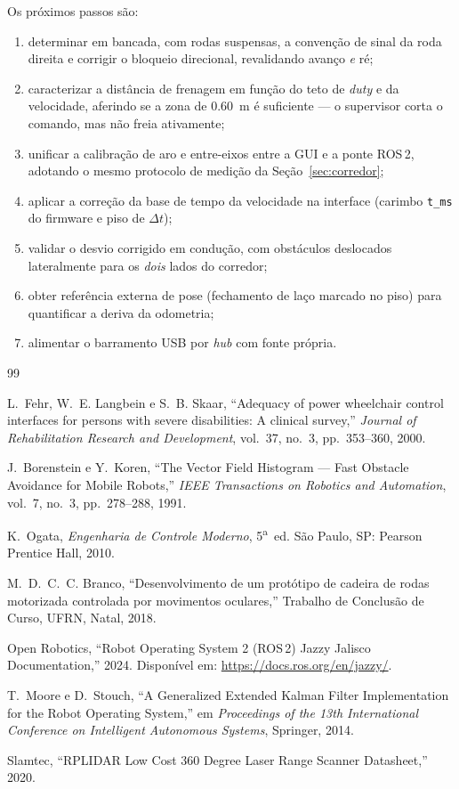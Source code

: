 \documentclass[conference]{IEEEtran}
\begin{document}
Os próximos passos são:
\begin{enumerate}
\item determinar em bancada, com rodas suspensas, a convenção de sinal da roda
direita e corrigir o bloqueio direcional, revalidando avanço \emph{e} ré;
\item caracterizar a distância de frenagem em função do teto de \emph{duty} e da
velocidade, aferindo se a zona de \SI{0.60}{\metre} é suficiente --- o supervisor
corta o comando, mas não freia ativamente;
\item unificar a calibração de aro e entre-eixos entre a GUI e a ponte ROS\,2,
adotando o mesmo protocolo de medição da Seção~\ref{sec:corredor};
\item aplicar a correção da base de tempo da velocidade na interface
(carimbo \texttt{t\_ms} do firmware e piso de $\Delta t$);
\item validar o desvio corrigido em condução, com obstáculos deslocados
lateralmente para os \emph{dois} lados do corredor;
\item obter referência externa de pose (fechamento de laço marcado no piso) para
quantificar a deriva da odometria;
\item alimentar o barramento USB por \emph{hub} com fonte própria.
\end{enumerate}

\begin{thebibliography}{99}

L.~Fehr, W.~E. Langbein e S.~B. Skaar, ``Adequacy of power wheelchair
control interfaces for persons with severe disabilities: A clinical
survey,'' \emph{Journal of Rehabilitation Research and Development},
vol.~37, no.~3, pp.~353--360, 2000.

J.~Borenstein e Y.~Koren, ``The Vector Field Histogram --- Fast Obstacle
Avoidance for Mobile Robots,'' \emph{IEEE Transactions on Robotics and
Automation}, vol.~7, no.~3, pp.~278--288, 1991.

K.~Ogata, \emph{Engenharia de Controle Moderno}, 5\textsuperscript{a}~ed.
São Paulo, SP: Pearson Prentice Hall, 2010.

M.~D.~C.~C. Branco, ``Desenvolvimento de um protótipo de cadeira de rodas
motorizada controlada por movimentos oculares,'' Trabalho de Conclusão
de Curso, UFRN, Natal, 2018.

Open Robotics, ``Robot Operating System 2 (ROS\,2) Jazzy Jalisco
Documentation,'' 2024. Disponível em:
\url{https://docs.ros.org/en/jazzy/}.

T.~Moore e D.~Stouch, ``A Generalized Extended Kalman Filter
Implementation for the Robot Operating System,'' em \emph{Proceedings of
the 13th International Conference on Intelligent Autonomous Systems},
Springer, 2014.

Slamtec, ``RPLIDAR Low Cost 360 Degree Laser Range Scanner Datasheet,''
2020.

\end{thebibliography}
\end{document}
